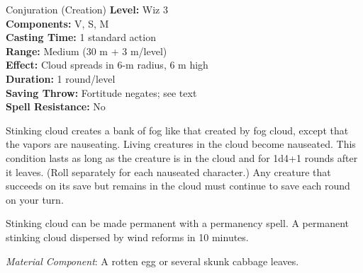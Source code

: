 {Conjuration (Creation)}
{
	\textbf{Level:}
	Wiz 3\\
	\textbf{Components:}
	V, S, M\\
	\textbf{Casting Time:}
	1 standard action\\
	\textbf{Range:}
	Medium (30 m + 3 m/level)\\
	\textbf{Effect:}
	Cloud spreads in 6-m radius, 6 m high\\
	\textbf{Duration:}
	1 round/level\\
	\textbf{Saving Throw:}
	Fortitude negates; see text\\
	\textbf{Spell Resistance:}
	No\\
}
{
	Stinking cloud creates a bank of fog like that created by fog cloud, except that the vapors are nauseating. Living creatures in the cloud become nauseated. This condition lasts as long as the creature is in the cloud and for 1d4+1 rounds after it leaves. (Roll separately for each nauseated character.) Any creature that succeeds on its save but remains in the cloud must continue to save each round on your turn.

	Stinking cloud can be made permanent with a permanency spell. A permanent stinking cloud dispersed by wind reforms in 10 minutes.

	\textit{Material Component}:
	A rotten egg or several skunk cabbage leaves.

}
